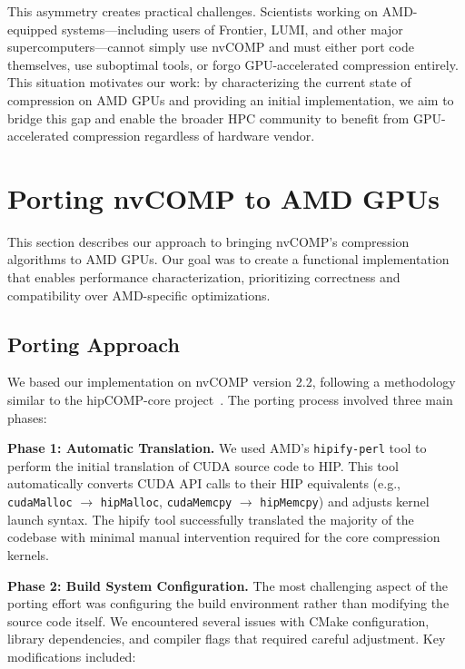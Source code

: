 \documentclass[runningheads]{llncs}
\begin{document}
This asymmetry creates practical challenges. Scientists working on AMD-equipped systems---including users of Frontier, LUMI, and other major supercomputers---cannot simply use nvCOMP and must either port code themselves, use suboptimal tools, or forgo GPU-accelerated compression entirely. This situation motivates our work: by characterizing the current state of compression on AMD GPUs and providing an initial implementation, we aim to bridge this gap and enable the broader HPC community to benefit from GPU-accelerated compression regardless of hardware vendor.




%


\section{Porting nvCOMP to AMD GPUs}
\label{sec:implementation}

This section describes our approach to bringing nvCOMP's compression algorithms to AMD GPUs. Our goal was to create a functional implementation that enables performance characterization, prioritizing correctness and compatibility over AMD-specific optimizations.

\subsection{Porting Approach}

We based our implementation on nvCOMP version 2.2, following a methodology similar to the hipCOMP-core project~\cite{hipcomp-core}. The porting process involved three main phases:

\textbf{Phase 1: Automatic Translation.} We used AMD's \texttt{hipify-perl} tool to perform the initial translation of CUDA source code to HIP. This tool automatically converts CUDA API calls to their HIP equivalents (e.g., \texttt{cudaMalloc} $\rightarrow$ \texttt{hipMalloc}, \texttt{cudaMemcpy} $\rightarrow$ \texttt{hipMemcpy}) and adjusts kernel launch syntax. The hipify tool successfully translated the majority of the codebase with minimal manual intervention required for the core compression kernels.

\textbf{Phase 2: Build System Configuration.} The most challenging aspect of the porting effort was configuring the build environment rather than modifying the source code itself. We encountered several issues with CMake configuration, library dependencies, and compiler flags that required careful adjustment. Key modifications included:
\end{document}
